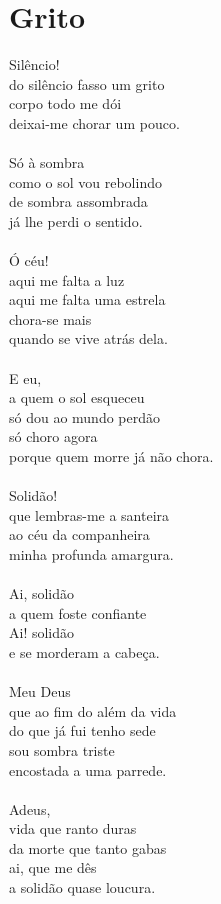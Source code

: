\documentclass{article}
\begin{document}
\section{ Grito}
Silêncio!\\
do silêncio fasso um grito\\
corpo todo me dói\\
deixai-me chorar um pouco.\\
\\
Só à sombra\\
como o sol vou rebolindo \\
de sombra assombrada\\
já lhe perdi o sentido.\\
\\
Ó céu!\\
aqui me falta a luz\\
aqui me falta uma estrela\\
chora-se mais \\
quando se vive atrás dela.\\
\\
E eu,\\
a quem o sol esqueceu\\
só dou ao mundo perdão \\
só choro agora \\
porque quem morre já não chora.\\
\\
Solidão!\\
que lembras-me a santeira\\
ao céu da companheira\\
minha profunda amargura.\\
\\
Ai, solidão\\
a quem foste confiante\\
Ai! solidão\\
e se morderam a cabeça.\\
\\
Meu Deus\\
que ao fim do além da vida\\
do que já fui tenho sede\\
sou sombra triste\\
encostada a uma parrede.\\
\\
Adeus, \\
vida que ranto duras\\
da morte que tanto gabas\\
ai, que me dês\\
a solidão quase loucura.\\
\\
\end{document}
